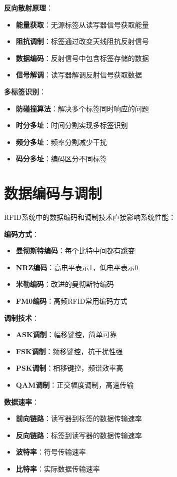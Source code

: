 \documentclass[12pt,UTF8]{ctexbook}
\begin{document}
\textbf{反向散射原理}：
\begin{itemize}[leftmargin=3.5em]
    \item \textbf{能量获取}：无源标签从读写器信号获取能量
    \item \textbf{阻抗调制}：标签通过改变天线阻抗反射信号
    \item \textbf{数据编码}：反射信号中包含标签存储的数据
    \item \textbf{信号解调}：读写器解调反射信号获取数据
\end{itemize}

\textbf{多标签识别}：
\begin{itemize}[leftmargin=3.5em]
    \item \textbf{防碰撞算法}：解决多个标签同时响应的问题
    \item \textbf{时分多址}：时间分割实现多标签识别
    \item \textbf{频分多址}：频率分割减少干扰
    \item \textbf{码分多址}：编码区分不同标签
\end{itemize}

\section{数据编码与调制}

RFID系统中的数据编码和调制技术直接影响系统性能：

\textbf{编码方式}：
\begin{itemize}[leftmargin=3.5em]
    \item \textbf{曼彻斯特编码}：每个比特中间都有跳变
    \item \textbf{NRZ编码}：高电平表示1，低电平表示0
    \item \textbf{米勒编码}：改进的曼彻斯特编码
    \item \textbf{FM0编码}：高频RFID常用编码方式
\end{itemize}

\textbf{调制技术}：
\begin{itemize}[leftmargin=3.5em]
    \item \textbf{ASK调制}：幅移键控，简单可靠
    \item \textbf{FSK调制}：频移键控，抗干扰性强
    \item \textbf{PSK调制}：相移键控，频谱效率高
    \item \textbf{QAM调制}：正交幅度调制，高速传输
\end{itemize}

\textbf{数据速率}：
\begin{itemize}[leftmargin=3.5em]
    \item \textbf{前向链路}：读写器到标签的数据传输速率
    \item \textbf{反向链路}：标签到读写器的数据传输速率
    \item \textbf{波特率}：符号传输速率
    \item \textbf{比特率}：实际数据传输速率
\end{itemize}
\end{document}
